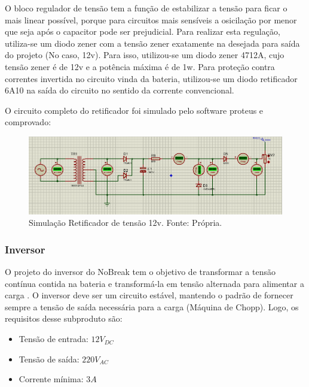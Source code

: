         O bloco regulador de tensão tem a função de estabilizar a tensão para ficar o 					mais linear possível, porque para circuitos mais sensíveis a osicilação por 					menor que seja após o capacitor  pode ser prejudicial. Para realizar esta 						regulação, utiliza-se um diodo zener com a tensão zener exatamente na desejada 				para saída do projeto (No caso, 12v).  Para isso, utilizou-se um diodo zener 					4712A, cujo tensão zener é de 12v e a potência máxima é de 1w. Para proteção 					contra correntes invertida no circuito vinda da bateria, utilizou-se um diodo 					retificador 6A10 na saída do circuito no sentido da corrente convencional.

        O circuito completo do retificador foi simulado pelo software proteus e 						comprovado:
        
        \begin{figure}[!htb]
            \centering
            \includegraphics[scale= 0.4]{figuras/Circuito_Retificador.png}
            \caption{Simulação Retificador de tensão 12v. Fonte: Própria.}
            \label{retificador-completo}
        \end{figure}

     \subsubsection[Inversor]{Inversor}
        O projeto do inversor do NoBreak tem o objetivo de transformar a tensão 						contínua contida na bateria e transformá-la em tensão alternada para alimentar 				a carga . O inversor deve ser um circuito estável, mantendo o padrão de 						fornecer sempre a tensão de saída necessária para a carga (Máquina de Chopp). 					Logo, os requisitos desse subproduto são:
        
        \begin{itemize}
            \item Tensão de entrada: $12V_{DC}$
            \item Tensão de saída: $220V_{AC}$
            \item Corrente mínima: $3A$
        \end{itemize}
        

